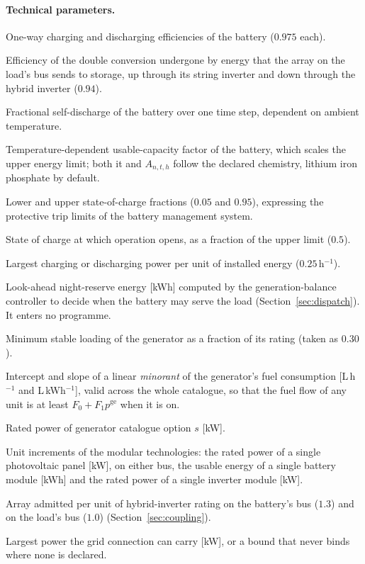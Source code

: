 \documentclass[11pt,a4paper]{article}
\theoremstyle{plain}
\theoremstyle{definition}
\begin{document}
\paragraph{Technical parameters.}
\begin{description}[leftmargin=3.0cm,style=nextline]
  \item[$H^{\mathrm{c}},\ H^{\mathrm{d}}$] One-way charging and discharging
  efficiencies of the battery ($0.975$ each).
  \item[$H^{\mathrm{ac}}$] Efficiency of the double conversion undergone by energy that
  the array on the load's bus sends to storage, up through its string inverter and down
  through the hybrid inverter ($0.94$).
  \item[$A_{n,t,h}$] Fractional self-discharge of the battery over one time step,
  dependent on ambient temperature.
  \item[{$F^{e}_{n,t,h}\in(0,1]$}] Temperature-dependent usable-capacity factor of the
  battery, which scales the upper energy limit; both it and $A_{n,t,h}$ follow the declared
  chemistry, lithium iron phosphate by default.
  \item[$\underline{E},\ \overline{E}$] Lower and upper state-of-charge fractions
  ($0.05$ and $0.95$), expressing the protective trip limits of the battery management
  system.
  \item[$E_0$] State of charge at which operation opens, as a fraction of the upper limit
  ($0.5$).
  \item[$\Gamma$] Largest charging or discharging power per unit of installed energy
  ($0.25$\,h$^{-1}$).
  \item[$R_{n,t,h}$] Look-ahead night-reserve energy [kWh] computed by the
  generation-balance controller to decide when the battery may serve the load
  (Section~\ref{sec:dispatch}). It enters no programme.
  \item[$F^{\mathrm{ge}}$] Minimum stable loading of the generator as a fraction of
  its rating (taken as $0.30$).
  \item[$F_0,\ F_1$] Intercept and slope of a linear \emph{minorant} of the generator's
  fuel consumption [L\,h$^{-1}$ and L\,kWh$^{-1}$], valid across the whole catalogue, so
  that the fuel flow of any unit is at least $F_0+F_1 p^{\mathrm{ge}}$ when it is on.
  \item[$K^{\mathrm{ge}}_s$] Rated power of generator catalogue option $s$ [kW].
  \item[$U^{\mathrm{pv}},\ U^{\mathrm{batt}},\ U^{\mathrm{inv}}$] Unit increments of the
  modular technologies: the rated power of a single photovoltaic panel [kW], on either
  bus, the usable energy of a single battery module [kWh] and the rated power of a single
  inverter module [kW].
  \item[$\rho^{\mathrm{dc}},\ \rho^{\mathrm{ac}}$] Array admitted per unit of hybrid-inverter
  rating on the battery's bus ($1.3$) and on the load's bus ($1.0$)
  (Section~\ref{sec:coupling}).
  \item[$\overline{G}$] Largest power the grid connection can carry [kW], or a bound that
  never binds where none is declared.
\end{description}
\end{document}
